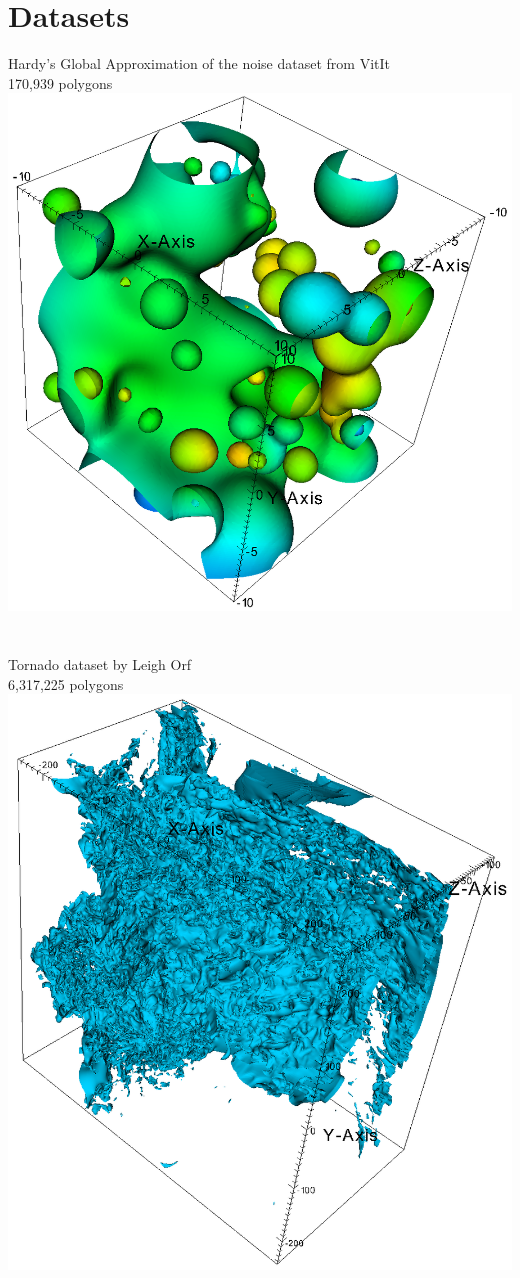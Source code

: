 \chapter*{Datasets}

Hardy's Global Approximation of the noise dataset from VitIt\\
170,939 polygons\\
\includegraphics[width=1\textwidth]{./pictures/hardyglobal.png}~\\
\\
Tornado dataset by Leigh Orf\\
6,317,225 polygons\\
\includegraphics[width=1\textwidth]{./pictures/tornado.png}~\\
